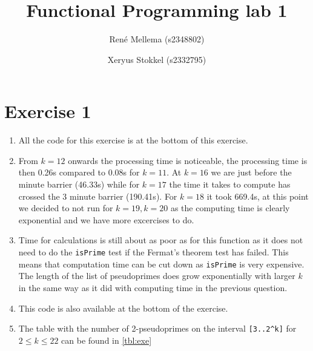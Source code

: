 \documentclass[a4paper]{article}
\title{Functional Programming lab 1}
\author{Ren\'e Mellema (s2348802) \and Xeryus Stokkel (s2332795)}
\begin{document}
\maketitle

\section*{Exercise 1}
\begin{enumerate}
	\item All the code for this exercise is at the bottom of this exercise.
	\item From $k=12$ onwards the processing time is noticeable, the processing time is then 0.26s compared to 0.08s for $k=11$. At $k=16$ we are just before the minute barrier (46.33s) while for $k=17$ the time it takes to compute has crossed the 3 minute barrier (190.41s). For $k=18$ it took 669.4s, at this point we decided to not run for $k=19,k=20$ as the computing time is clearly exponential and we have more excercises to do.
	\item Time for calculations is still about as poor as for this function as it does not need to do the \texttt{isPrime} test if the Fermat's theorem test has failed. This means that computation time can be cut down as \texttt{isPrime} is very expensive. The length of the list of pseudoprimes does grow exponentially with larger $k$ in the same way as it did with computing time in the previous question.
	\item This code is also available at the bottom of the exercise.
	\item The table with the number of 2-pseudoprimes on the interval \lstinline{[3..2^k]} for $2 \le k \le 22$ can be found in \autoref{tbl:exe}
\end{enumerate}
\end{document}
